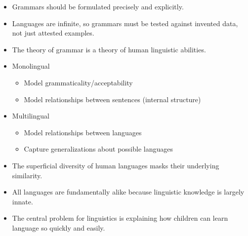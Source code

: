 \documentclass[a4paper,landscape,headrule,footrule]{foils}
\begin{document}
\begin{itemize}
\item Grammars should be formulated precisely
and explicitly.
\item Languages are infinite, so grammars must be
tested against invented data, not just attested
examples.
\item The theory of grammar is a theory of human
linguistic abilities.
\end{itemize}

\begin{itemize}
\item Monolingual
\begin{itemize}
\item Model grammaticality/acceptability
\item Model relationships between sentences
(internal structure)
\end{itemize}
\item Multilingual
\begin{itemize}
\item Model relationships between languages
\item Capture generalizations about possible
languages
\end{itemize}
\end{itemize}

\begin{itemize}
\item The superficial diversity of human languages
masks their underlying similarity.
\item All languages are fundamentally alike
because linguistic knowledge is largely
innate.
\item The central problem for linguistics is
explaining how children can learn language
so quickly and easily.
\end{itemize}


\newcommand{\gr}[2]{#1  (#2)}

\end{document}
